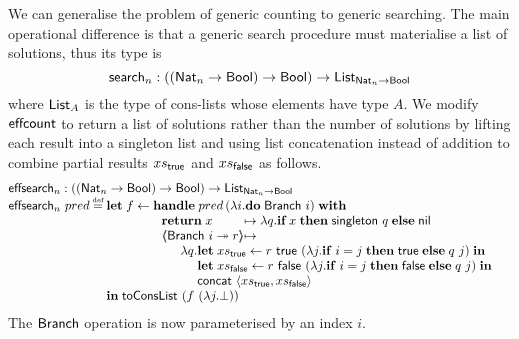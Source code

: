 \documentclass[12pt,phd,lfcs,twoside,openright,logo,leftchapter,normalheadings]{infthesis}
\theoremstyle{plain}
\theoremstyle{definition}
\begin{document}
We can generalise the problem of generic counting to generic
searching. The main operational difference is that a generic search
procedure must materialise a list of solutions, thus its type is
%
{
\[
  \mathsf{search}_{n} : ((\mathsf{Nat}_n \to \mathsf{Bool}) \to \mathsf{Bool}) \to \mathsf{List}_{\mathsf{Nat}_n \to \mathsf{Bool}}
\]}%
%
where $\mathsf{List}_A$ is the type of cons-lists whose elements have type
$A$.
%
We modify $\mathsf{effcount}$ to return a list of solutions rather than the
number of solutions by lifting each result into a singleton list and
using list concatenation instead of addition to combine partial
results $xs_{\mathsf{true}}$ and $xs_{\mathsf{false}}$ as follows.
%
\newcommand{\ESearch}{\mathsf{effsearch}}
\newcommand{\Singleton}{\mathsf{singleton}}
\newcommand{\Concat}{\mathsf{concat}}
\newcommand{\HughesList}{\mathsf{HList}}
\newcommand{\ToConsList}{\mathsf{toConsList}}
{
\[
  \bl
    \ESearch_n : ((\Nat_n \to \Bool) \to \Bool) \to \List_{\Nat_n \to \Bool}\\
    \ESearch_n~pred \defas
         \bl\Let\; f \revto \bl
                             \Handle\; pred\,(\lambda i. \Do\; \Branch~i)\; \With\\
                             ~~\ba[t]{@{}l@{}l}
                                           \Return\; x &\mapsto \lambda q. \If\, x \;\Then\; \Singleton~q \;\Else\; \dec{nil} \\
                                           \OpCase{\Branch}{i}{r} &\mapsto\\
                                             \multicolumn{2}{l}{\quad\ba[t]{@{}l}\lambda q.
                                                \ba[t]{@{}l}
                                                 \Let\;xs_\True \revto  r~\True~(\lambda j.\If\;i=j\;\Then\;\True\;\Else\;q~j) \;\In\\
                                                 \Let\;xs_\False \revto r~\False~(\lambda j. \If\;i=j\;\Then\;\False\;\Else\;q~j) \;\In\\
                                                 \Concat~\Record{xs_\True,xs_\False} \\
                                                 \ea\\
                                             \ea}\\
                              \ea \\
                              \el \\
             \In\;\ToConsList~(f~(\lambda j. \bot))
          \el \\
  \el
\]}%
%
The $\mathsf{Branch}$ operation is now parameterised by an index $i$.
\end{document}
